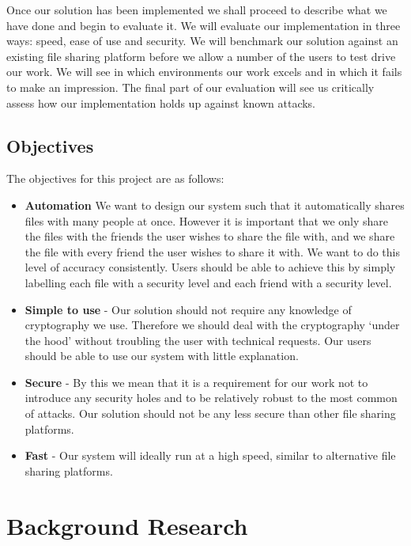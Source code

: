 \documentclass[12pt, titlepage]{article}
\begin{document}
\newline \indent Once our solution has been implemented we shall proceed to describe what we have done and begin to evaluate it. We will evaluate our implementation in three ways: speed, ease of use and security. We will benchmark our solution against an existing file sharing platform before we allow a number of the users to test drive our work. We will see in which environments our work excels and in which it fails to make an impression. The final part of our evaluation will see us critically assess how our implementation holds up against known attacks.

\subsection{Objectives}
The objectives for this project are as follows:
\begin{itemize}
	\item \textbf{Automation} We want to design our system such that it automatically shares files with many people at once. However it is important that we only share the files with the friends the user wishes to share the file with, and we share the file with every friend the user wishes to share it with. We want to do this level of accuracy consistently. Users should be able to achieve this by simply labelling each file with a security level and each friend with a security level.
	\item \textbf{Simple to use} - Our solution should not require any knowledge of cryptography we use. Therefore we should deal with the cryptography `under the hood' without troubling the user with technical requests. Our users should be able to use our system with little explanation.
	\item \textbf{Secure} - By this we mean that it is a requirement for our work not to introduce any security holes and to be relatively robust to the most common of attacks. Our solution should not be any less secure than other file sharing platforms.
	\item \textbf{Fast} - Our system will ideally run at a high speed, similar to alternative file sharing platforms.
\end{itemize} 

\newpage
\section{Background Research}
\end{document}
